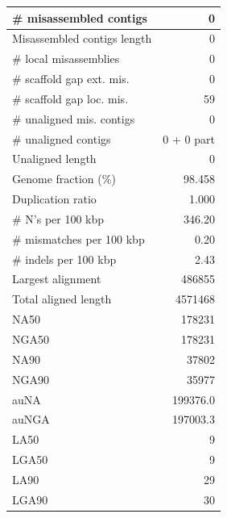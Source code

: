 \documentclass[12pt,a4paper]{article}
\begin{document}
\begin{table}[ht]
\begin{center}
\begin{tabular}{|l*{1}{|r}|}
\# misassembled contigs & 0 \\ \hline
Misassembled contigs length & 0 \\ \hline
\# local misassemblies & 0 \\ \hline
\# scaffold gap ext. mis. & 0 \\ \hline
\# scaffold gap loc. mis. & 59 \\ \hline
\# unaligned mis. contigs & 0 \\ \hline
\# unaligned contigs & 0 + 0 part \\ \hline
Unaligned length & 0 \\ \hline
Genome fraction (\%) & 98.458 \\ \hline
Duplication ratio & 1.000 \\ \hline
\# N's per 100 kbp & 346.20 \\ \hline
\# mismatches per 100 kbp & 0.20 \\ \hline
\# indels per 100 kbp & 2.43 \\ \hline
Largest alignment & 486855 \\ \hline
Total aligned length & 4571468 \\ \hline
NA50 & 178231 \\ \hline
NGA50 & 178231 \\ \hline
NA90 & 37802 \\ \hline
NGA90 & 35977 \\ \hline
auNA & 199376.0 \\ \hline
auNGA & 197003.3 \\ \hline
LA50 & 9 \\ \hline
LGA50 & 9 \\ \hline
LA90 & 29 \\ \hline
LGA90 & 30 \\ \hline
\end{tabular}
\end{center}
\end{table}
\end{document}
